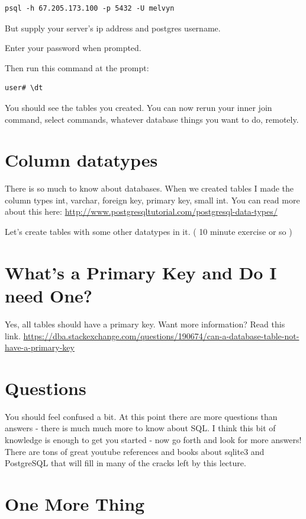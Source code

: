 \documentclass[12pt,a4paper]{article}
\begin{document}
\begin{verbatim}
psql -h 67.205.173.100 -p 5432 -U melvyn
\end{verbatim}

But supply your server's ip address and postgres username.

Enter your password when prompted.

Then run this command at the prompt:

\begin{verbatim}
user# \dt
\end{verbatim}

You should see the tables you created. You can now rerun your inner join command, select commands, whatever database things you want to do, remotely.

\section{Column datatypes}
There is so much to know about databases. When we created tables I made the column types int, varchar, foreign key, primary key, small int. You can read more about this here:
\url{http://www.postgresqltutorial.com/postgresql-data-types/}

Let's create tables with some other datatypes in it. ( 10 minute exercise or so )

\section{ What's a Primary Key and Do I need One?}
Yes, all tables should have a primary key. Want more information? Read this
link.
\url{https://dba.stackexchange.com/questions/190674/can-a-database-table-not-have-a-primary-key}

\section{ Questions }
You should feel confused a bit. At this point there are more questions than
answers - there is much much more to know about SQL. I think  this bit of
knowledge is enough to get you started - now go forth and look  for more
answers! There are tons of great youtube references and books about sqlite3 and
PostgreSQL that will fill in many of the cracks left by this lecture.

\section{One More Thing}
\end{document}
